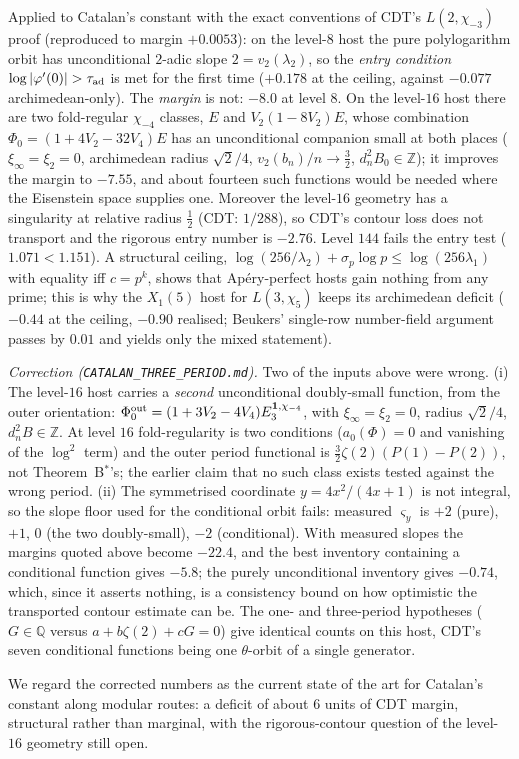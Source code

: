 Applied to Catalan's constant with the exact conventions of CDT's $L(2,\chi_{-3})$ proof (reproduced to margin $+0.0053$): on the level-$8$ host the pure polylogarithm orbit has unconditional $2$-adic slope $2=v_2(\lambda_2)$, so the \emph{entry condition} $\log|\varphi'(0)|>\tau_{\rm ad}$ is met for the first time ($+0.178$ at the ceiling, against $-0.077$ archimedean-only). The \emph{margin} is not: $-8.0$ at level $8$. On the level-$16$ host there are two fold-regular $\chi_{-4}$ classes, $E$ and $V_2(1-8V_2)E$, whose combination $\Phi_0=(1+4V_2-32V_4)E$ has an unconditional companion small at both places ($\xi_\infty=\xi_2=0$, archimedean radius $\sqrt2/4$, $v_2(b_n)/n\to\tfrac32$, $d_n^2B_0\in\mathbb Z$); it improves the margin to $-7.55$, and about fourteen such functions would be needed where the Eisenstein space supplies one. Moreover the level-$16$ geometry has a singularity at relative radius $\tfrac12$ (CDT: $1/288$), so CDT's contour loss does not transport and the rigorous entry number is $-2.76$. Level $144$ fails the entry test ($1.071<1.151$). A structural ceiling, $\log(256/\lambda_2)+\sigma_p\log p\le\log(256\lambda_1)$ with equality iff $c=p^k$, shows that Ap\'ery-perfect hosts gain nothing from any prime; this is why the $X_1(5)$ host for $L(3,\chi_5)$ keeps its archimedean deficit ($-0.44$ at the ceiling, $-0.90$ realised; Beukers' single-row number-field argument passes by $0.01$ and yields only the mixed statement).

\emph{Correction (\texttt{CATALAN\_THREE\_PERIOD.md}).} Two of the inputs above were wrong. (i) The level-$16$ host carries a \emph{second} unconditional doubly-small function, from the outer orientation: $\Phi_0^{\rm out}=(1+3V_2-4V_4)E_3^{\mathbf 1,\chi_{-4}}$, with $\xi_\infty=\xi_2=0$, radius $\sqrt2/4$, $d_n^2B\in\mathbb Z$. At level $16$ fold-regularity is two conditions ($a_0(\Phi)=0$ and vanishing of the $\log^2$ term) and the outer period functional is $\tfrac32\zeta(2)(P(1)-P(2))$, not Theorem~B$^*$'s; the earlier claim that no such class exists tested against the wrong period. (ii) The symmetrised coordinate $y=4x^2/(4x+1)$ is not integral, so the slope floor used for the conditional orbit fails: measured $\varsigma_y$ is $+2$ (pure), $+1$, $0$ (the two doubly-small), $-2$ (conditional). With measured slopes the margins quoted above become $-22.4$, and the best inventory containing a conditional function gives $-5.8$; the purely unconditional inventory gives $-0.74$, which, since it asserts nothing, is a consistency bound on how optimistic the transported contour estimate can be. The one- and three-period hypotheses ($G\in\mathbb Q$ versus $a+b\zeta(2)+cG=0$) give identical counts on this host, CDT's seven conditional functions being one $\theta$-orbit of a single generator.

We regard the corrected numbers as the current state of the art for Catalan's constant along modular routes: a deficit of about $6$ units of CDT margin, structural rather than marginal, with the rigorous-contour question of the level-$16$ geometry still open.
